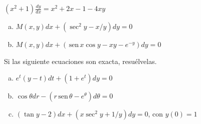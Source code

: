 \documentclass[12pt]{exam}
\renewcommand{\sin}{\,\text{sen}\,}
\begin{document}
\begin{questions}
\begin{enumerate}[a)]
\end{enumerate}

     \question%
     \item	$(x^2+1)\frac{dy}{dx}=x^2+2x-1-4xy$
     \begin{enumerate}[a)]
     	\item	$M(x,y)dx+(\sec^2y-x/y)dy=0$
        \item	$M(x,y)dx+(\sin x\cos y-xy-e^{-y})dy=0$
     \end{enumerate}

     \question%
      Si las siguiente ecuaciones son exacta, resuélvelas.
      \begin{enumerate}[a)]
      	\item	$e^t(y-t)dt+(1+e^t)dy=0$
        \item	$\cos\theta dr-(r\sin\theta-e^{\theta})d\theta=0$
        \item	$(\tan y-2)dx+(x\sec^2y+1/y)dy=0$, con $y(0)=1$
      \end{enumerate}





        \end{questions}
        \vskip30pt
 
 
    




\pagestyle{foot}    %



\end{document}
